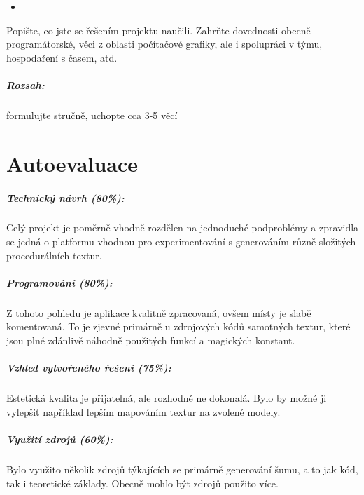 \documentclass[12pt,a4paper,titlepage,final]{report}
\begin{document}
\begin{itemize}
	\item 
\end{itemize}

Popište, co jste se řešením projektu naučili. Zahrňte dovednosti obecně
programátorské, věci z oblasti počítačové grafiky, ale i spolupráci v týmu,
hospodaření s časem, atd.

\paragraph{Rozsah:} formulujte stručně, uchopte cca 3-5 věcí

\chapter{Autoevaluace}

\paragraph{Technický návrh (80\%):} Celý projekt je poměrně vhodně rozdělen na jednoduché podproblémy a zpravidla se jedná o platformu vhodnou pro experimentování s generováním různě složitých procedurálních textur.

\paragraph{Programování (80\%):} Z tohoto pohledu je aplikace kvalitně zpracovaná, ovšem místy je slabě komentovaná. To je zjevné primárně u zdrojových kódů samotných textur, které jsou plné zdánlivě náhodně použitých funkcí a magických konstant.

\paragraph{Vzhled vytvořeného řešení (75\%):} Estetická kvalita je přijatelná, ale rozhodně ne dokonalá. Bylo by možné ji vylepšit například lepším mapováním textur na zvolené modely.

\paragraph{Využití zdrojů (60\%):} Bylo využito několik zdrojů týkajících se primárně generování šumu, a to jak kód, tak i teoretické základy. Obecně mohlo být zdrojů použito více.
\end{document}
